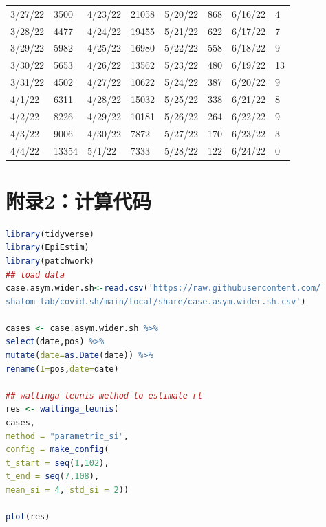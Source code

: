 \documentclass[a4paper,12pt,onecolumn,twoside]{article}
\begin{document}
\begin{table}[H]
\begin{tabular}{ll|ll|ll|ll}
		3/27/22 & 3500  & 4/23/22 & 21058 & 5/20/22 & 868   & 6/16/22 & 4      \\
		3/28/22 & 4477  & 4/24/22 & 19455 & 5/21/22 & 622   & 6/17/22 & 7      \\
		3/29/22 & 5982  & 4/25/22 & 16980 & 5/22/22 & 558   & 6/18/22 & 9      \\
		3/30/22 & 5653  & 4/26/22 & 13562 & 5/23/22 & 480   & 6/19/22 & 13     \\
		3/31/22 & 4502  & 4/27/22 & 10622 & 5/24/22 & 387   & 6/20/22 & 9      \\
		4/1/22  & 6311  & 4/28/22 & 15032 & 5/25/22 & 338   & 6/21/22 & 8      \\
		4/2/22  & 8226  & 4/29/22 & 10181 & 5/26/22 & 264   & 6/22/22 & 9      \\
		4/3/22  & 9006  & 4/30/22 & 7872  & 5/27/22 & 170   & 6/23/22 & 3      \\
		4/4/22  & 13354 & 5/1/22  & 7333  & 5/28/22 & 122   & 6/24/22 & 0      \\
		\hline
	\end{tabular}
\end{table}

\section*{附录2：计算代码}
\begin{lstlisting}[language=R]
library(tidyverse)
library(EpiEstim)
library(patchwork)
## load data
case.asym.wider.sh<-read.csv('https://raw.githubusercontent.com/
shalom-lab/covid.sh/main/local/share/case.asym.wider.sh.csv')

cases <- case.asym.wider.sh %>%
select(date,pos) %>%
mutate(date=as.Date(date)) %>%
rename(I=pos,date=date)

## wallinga-teunis method to estimate rt
res <- wallinga_teunis(
cases,
method = "parametric_si",
config = make_config(
t_start = seq(1,102),
t_end = seq(7,108),
mean_si = 4, std_si = 2))

plot(res)

\end{lstlisting}
\end{document}
